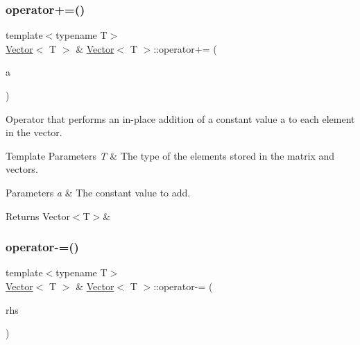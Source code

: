 \subsubsection{\texorpdfstring{operator+=()}{operator+=()}\hspace{0.1cm}{\footnotesize\ttfamily [2/2]}}
{\footnotesize\ttfamily template$<$typename T$>$ \\
\mbox{\hyperlink{classVector}{Vector}}$<$ T $>$ \& \mbox{\hyperlink{classVector}{Vector}}$<$ T $>$\+::operator+= (\begin{DoxyParamCaption}\item[{const T \&}]{a }\end{DoxyParamCaption})\hspace{0.3cm}{\ttfamily [inline]}}



Operator that performs an in-\/place addition of a constant value {\ttfamily a} to each element in the vector. 


\begin{DoxyTemplParams}{Template Parameters}
{\em T} & The type of the elements stored in the matrix and vectors. \\
\hline
\end{DoxyTemplParams}

\begin{DoxyParams}{Parameters}
{\em a} & The constant value to add. \\
\hline
\end{DoxyParams}
\begin{DoxyReturn}{Returns}
Vector$<$\+T$>$\& 
\end{DoxyReturn}
\mbox{\label{classVector_ab5ed11e19503bbc0ee10c7a8d1ee2978}} 
\subsubsection{\texorpdfstring{operator-\/=()}{operator-=()}\hspace{0.1cm}{\footnotesize\ttfamily [1/2]}}
{\footnotesize\ttfamily template$<$typename T$>$ \\
\mbox{\hyperlink{classVector}{Vector}}$<$ T $>$ \& \mbox{\hyperlink{classVector}{Vector}}$<$ T $>$\+::operator-\/= (\begin{DoxyParamCaption}\item[{const \mbox{\hyperlink{classVector}{Vector}}$<$ T $>$ \&}]{rhs }\end{DoxyParamCaption})\hspace{0.3cm}{\ttfamily [inline]}}



